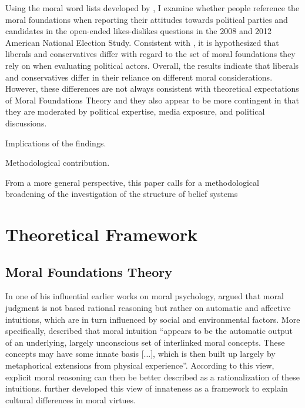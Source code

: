 \documentclass[12pt]{article}
\begin{document}
Using the moral word lists developed by \citet{graham2009liberals}, I examine whether people reference the moral foundations when reporting their attitudes towards political parties and candidates in the open-ended likes-dislikes questions in the 2008 and 2012 American National Election Study. Consistent with \citet{graham2009liberals}, it is hypothesized that liberals and conservatives differ with regard to the set of moral foundations they rely on when evaluating political actors. Overall, the results indicate that liberals and conservatives differ in their reliance on different moral considerations. However, these differences are not always consistent with theoretical expectations of Moral Foundations Theory and they also appear to be more contingent in that they are moderated by political expertise, media exposure, and political discussions. 

Implications of the findings.

Methodological contribution.

From a more general perspective, this paper calls for a methodological broadening of the investigation of the structure of belief systems

\section{Theoretical Framework}

\subsection{Moral Foundations Theory}

In one of his influential earlier works on moral psychology, \citet{haidt2001emotional} argued that moral judgment is not based rational reasoning but rather on automatic and affective intuitions, which are in turn influenced by social and environmental factors. More specifically, \citet[825]{haidt2001emotional} described that moral intuition ``appears to be the automatic output of an underlying, largely unconscious set of interlinked moral concepts. These concepts may have some innate basis [...], which is then built up largely by metaphorical extensions from physical experience''. According to this view, explicit moral reasoning can then be better described as a rationalization of these intuitions. \citet{haidt2004intuitive} further developed this view of innateness as a framework to explain cultural differences in moral virtues.
\end{document}
